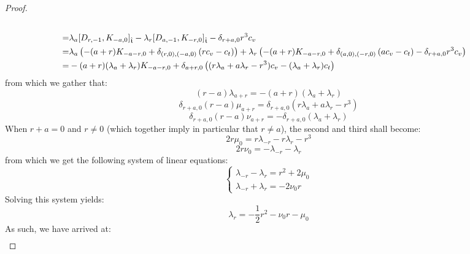 \begin{proof}
$$\begin{aligned}
                            \\
                            = & \lambda_a [ D_{r, -1}, K_{-a, 0} ]_{\extendedtoroidal} -  \lambda_r [ D_{a, -1}, K_{-r, 0} ]_{\extendedtoroidal} - \delta_{r + a, 0} r^3 c_v
                            \\
                            = &
                            \lambda_a \left(
                                -(a + r) K_{-a - r, 0} + \delta_{(r, 0), (-a, 0)} \left( r c_v - c_t \right)
                            \right)
                            +
                            \lambda_r \left(
                                -(a + r) K_{-a - r, 0} + \delta_{(a, 0), (-r, 0)} \left( a c_v - c_t \right)
                            -
                            \delta_{r + a, 0} r^3 c_v
                            \right)
                            \\
                            = &
                            -(a + r) ( \lambda_a + \lambda_r ) K_{-a - r, 0}
                            +
                            \delta_{a + r, 0} \left( (r \lambda_a + a \lambda_r - r^3) c_v - (\lambda_a + \lambda_r)c_t \right)
                        \end{aligned}
                    $$
                from which we gather that:
                    $$(r - a) \lambda_{a + r} = -(a + r) ( \lambda_a + \lambda_r )$$
                    $$\delta_{r + a, 0} (r - a) \mu_{a + r} = \delta_{r + a, 0} (r \lambda_a + a \lambda_r - r^3)$$
                    $$\delta_{r + a, 0} (r - a) \nu_{a + r} = -\delta_{r + a, 0}(\lambda_a + \lambda_r)$$
                When $r + a = 0$ and $r \not = 0$ (which together imply in particular that $r \not = a$), the second and third shall become:
                    $$2r \mu_0 = r \lambda_{-r} - r\lambda_r - r^3$$
                    $$2r \nu_0 = -\lambda_{-r} - \lambda_r$$
                from which we get the following system of linear equations:
                    $$
                        \begin{cases}
                            \lambda_{-r} - \lambda_r = r^2 + 2\mu_0
                            \\
                            \lambda_{-r} + \lambda_r = -2\nu_0 r
                        \end{cases}
                    $$
                Solving this system yields:
                    $$\lambda_r = -\frac12 r^2 - \nu_0 r - \mu_0$$
                As such, we have arrived at:
                    $$
                        \begin{aligned}

\end{aligned}$$
\end{proof}
